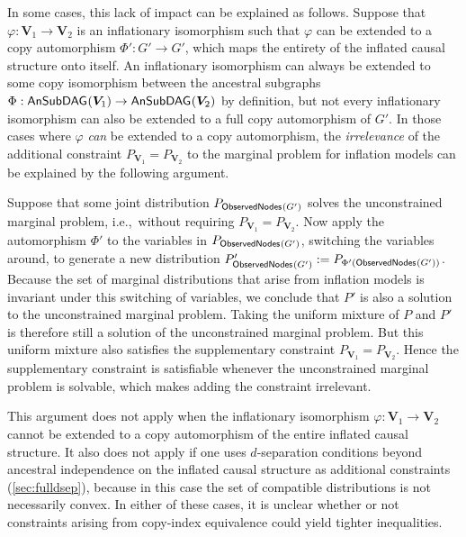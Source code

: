 \documentclass[aps,english,10pt,superscriptaddress,onecolumn,twoside,longbibliography,pra,floatfix,fleqn,nofootinbib]{revtex4-1}
\theoremstyle{definition}
\newcommand{\An}[2][]{{\mathsf{An}_{#1}}\parenths{#2}}
\newcommand{\SmallNamedFunction}[3][]{\operatorname{\mathsf{#2}}_{#1}\parenths{#3}}
\newcommand{\ansubgraph}[2][]{\SmallNamedFunction[#1]{AnSubDAG}{#2}}
\newcommand{\obsnodes}[1]{\SmallNamedFunction{ObservedNodes}{#1}}
\DeclarePairedDelimiter{\parenths}{\lparen}{\rparen}
\begin{document}
In some cases, this lack of impact can be explained as follows.
Suppose that $\varphi:\bm{V}_1\to\bm{V}_2$ is an inflationary isomorphism such that $\varphi$ can be extended to a copy automorphism 
$\Phi':G'\to G'$, which maps the entirety of the inflated causal structure onto itself. An inflationary isomorphism can always be extended to some copy isomorphism between the ancestral subgraphs $\Phi:\ansubgraph{\bm{V}_1}\to\ansubgraph{\bm{V}_2}$ by definition, but not every inflationary isomorphism can also be extended to a full copy automorphism of $G'$.
In those cases where $\varphi$ \emph{can} be extended to a copy automorphism, %
the \emph{irrelevance} of the additional constraint $P_{\bm{V}_1} = P_{\bm{V}_2}$ to the marginal problem for inflation models can be explained by the following argument. 

Suppose that some joint distribution $P_{\obsnodes{G'}}$ solves the unconstrained marginal problem, i.e.,~without requiring $P_{\bm{V}_1} = P_{\bm{V}_2}$. Now apply the automorphism $\Phi'$ to the variables in $P_{\obsnodes{G'}}$, switching the variables around, to generate a new distribution $P'_{\obsnodes{G'}}:=P_{\Phi'(\obsnodes{G'})}$. Because the set of marginal distributions that arise from inflation models is invariant under this switching of variables, we conclude that $P'$ is also a solution to the unconstrained marginal problem. Taking the uniform mixture of $P$ and $P'$ is therefore still a solution of the unconstrained marginal problem. But this uniform mixture also satisfies the supplementary constraint $P_{\bm{V}_1} = P_{\bm{V}_2}$. Hence the supplementary constraint is satisfiable whenever the unconstrained marginal problem is solvable, which makes adding the constraint irrelevant.

This argument does not apply when the inflationary isomorphism $\varphi:\bm{V}_1\to\bm{V}_2$ cannot be extended to a copy automorphism of the entire inflated causal structure. It also does not apply if one uses $d$-separation conditions beyond ancestral independence on the inflated causal structure as additional constraints (\cref{sec:fulldsep}), because in this case the set of compatible distributions is not necessarily convex.  In either of these cases, it is unclear whether or not constraints arising from copy-index equivalence could yield tighter inequalities. 
\end{document}
